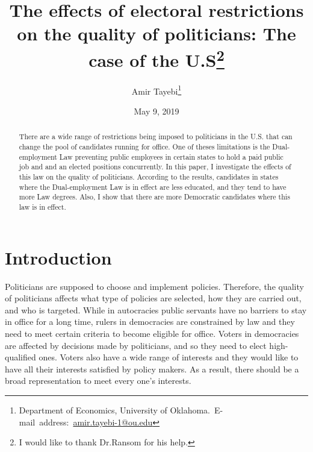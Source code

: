 \documentclass[12pt,english]{article}
\begin{document}
\begin{singlespace}
\title{The effects of electoral restrictions on the quality of politicians: The case of the U.S\thanks{I would like to thank Dr.Ransom for his help.}}
\end{singlespace}

\author{Amir Tayebi\thanks{Department of Economics, University of Oklahoma.\
E-mail~address:~\href{mailto:amir.tayebi-1@ou.edu}{amir.tayebi-1@ou.edu}}}

\date{May 9, 2019}

\maketitle

\begin{abstract}
\begin{singlespace}
There are a wide range of restrictions being imposed to politicians in the U.S. that can change the pool of candidates running for office. One of theses limitations is the Dual-employment Law preventing public employees in certain states to hold a paid public job and and an elected positions concurrently. In this paper, I investigate the effects of this law on the quality of politicians. According to the results, candidates in states where the Dual-employment Law is in effect are less educated, and they tend to have more Law degrees. Also, I show that there are more Democratic candidates where this law is in effect.
\end{singlespace}

\end{abstract}
\vfill{}


\pagebreak{}


\section{Introduction}\label{sec:intro}

Politicians are supposed to choose and implement policies. Therefore, the quality of politicians affects what type of policies are selected, how they are carried out, and who is targeted. While in autocracies public servants have no barriers to stay in office for a long time, rulers in democracies are constrained by law and they need to meet certain criteria to become eligible for office. Voters in democracies are affected by decisions made by politicians, and so they need to elect high-qualified ones. Voters also have a wide range of interests and they would like to have all their interests satisfied by policy makers. As a result, there should be a broad representation to meet every one’s interests.
\end{document}
